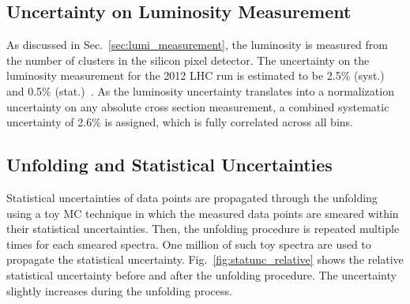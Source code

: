 \subsection {Uncertainty on Luminosity Measurement}
\label{sec:luminosity_uncertainty}

As discussed in Sec.~\ref{sec:lumi_measurement}, the luminosity is measured from
the number of clusters in the silicon pixel detector. The uncertainty on the
luminosity measurement for the 2012 LHC run is estimated to be 2.5\% (syst.) and
0.5\% (stat.)~\cite{CMS-PAS-LUM-13-001}. As the luminosity uncertainty
translates into a normalization uncertainty on any absolute cross section
measurement, a combined systematic uncertainty of 2.6\% is assigned, which is
fully correlated across all bins.

\subsection{Unfolding and Statistical Uncertainties}
\label{sec:stat_unf_uncert}

Statistical uncertainties of data points are propagated through the unfolding
using a toy MC technique in which the measured data points are smeared within
their statistical uncertainties. Then, the unfolding procedure is repeated multiple
times for each smeared spectra. One million of such toy spectra are used to
propagate the statistical uncertainty. Fig.~\ref{fig:statunc_relative} shows
the relative statistical uncertainty before and after the unfolding procedure.
The uncertainty slightly increases during the unfolding process.

